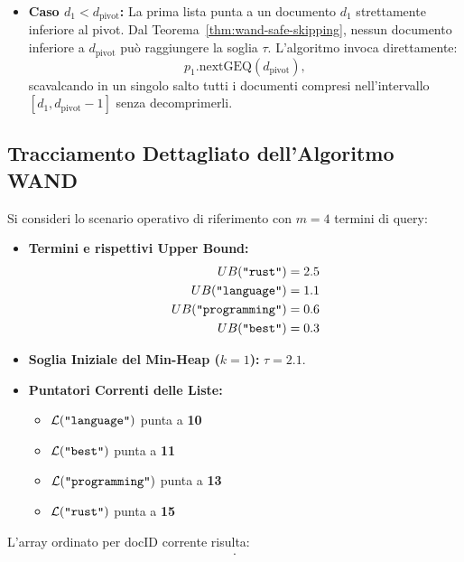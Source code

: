 \begin{enumerate}
\begin{itemize}
        \item \textbf{Caso $d_1 < d_{\text{pivot}}$:} La prima lista punta a un documento $d_1$ strettamente inferiore al pivot. Dal Teorema~\ref{thm:wand-safe-skipping}, nessun documento inferiore a $d_{\text{pivot}}$ pu\`o raggiungere la soglia $\tau$. L'algoritmo invoca direttamente:
        \begin{equation}
            p_1.\text{nextGEQ}(d_{\text{pivot}}),
        \end{equation}
        scavalcando in un singolo salto tutti i documenti compresi nell'intervallo $[d_1, d_{\text{pivot}} - 1]$ senza decomprimerli.
    \end{itemize}
\end{enumerate}

\FloatBarrier
\subsection{Tracciamento Dettagliato dell'Algoritmo WAND}
\label{subsec:tracciamento-wand}
Si consideri lo scenario operativo di riferimento con $m = 4$ termini di query:
\begin{itemize}
    \item \textbf{Termini e rispettivi Upper Bound:}
    \begin{align*}
        UB(\text{\texttt{"rust"}}) &= 2.5 \\
        UB(\text{\texttt{"language"}}) &= 1.1 \\
        UB(\text{\texttt{"programming"}}) &= 0.6 \\
        UB(\text{\texttt{"best"}}) &= 0.3
    \end{align*}
    \item \textbf{Soglia Iniziale del Min-Heap ($k = 1$):} $\tau = 2.1$.
    \item \textbf{Puntatori Correnti delle Liste:}
    \begin{itemize}
        \item $\mathcal{L}(\text{\texttt{"language"}})$ punta a \textbf{10}
        \item $\mathcal{L}(\text{\texttt{"best"}})$ punta a \textbf{11}
        \item $\mathcal{L}(\text{\texttt{"programming"}})$ punta a \textbf{13}
        \item $\mathcal{L}(\text{\texttt{"rust"}})$ punta a \textbf{15}
    \end{itemize}
\end{itemize}

L'array ordinato per docID corrente risulta:
\begin{align*}
    [\, &\langle \text{\texttt{"language"}}, 10, 1.1 \rangle, \; \langle \text{\texttt{"best"}}, 11, 0.3 \rangle, \\
        &\langle \text{\texttt{"programming"}}, 13, 0.6 \rangle, \; \langle \text{\texttt{"rust"}}, 15, 2.5 \rangle \,].
\end{align*}

